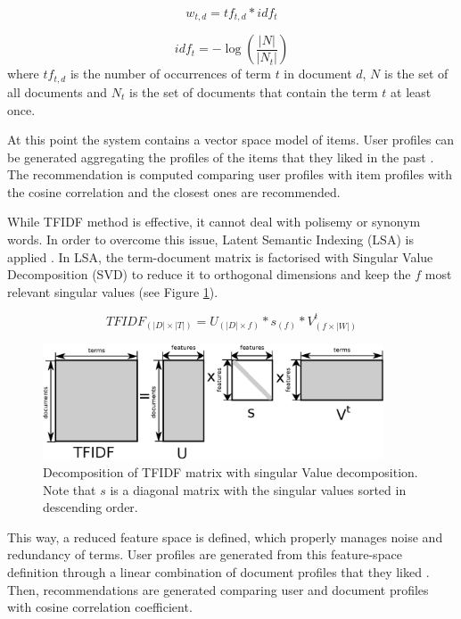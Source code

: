 \documentclass[preprint]{elsarticle}
\begin{document}
\begin{spacing}{1.5}
\begin{equation}
	w_{t,d} = tf_{t,d}*idf_{t}
	\label{eq:document-profile-tfidf-term-weights}
\end{equation}

\begin{equation}
	idf_t = -\log \left( \frac{|N|}{|N_t|}\right)
	\label{eq:document-profile-tfidf-idf}
\end{equation}
\noindent where $tf_{t,d}$ is the number of occurrences of term $t$ in document $d$, $N$ is the set of all documents and $N_t$ is the set of documents that contain the term $t$ at least once.

At this point the system contains a vector space model of items. User profiles can be generated aggregating the profiles of the items that they liked in the past \cite{Symeonidis2007}. The recommendation is computed comparing user profiles with item profiles with the cosine correlation and the closest ones are recommended. 

While TFIDF method is effective, it cannot deal with polisemy or synonym words. In order to overcome this issue, Latent Semantic Indexing (LSA) is applied \cite{deGemmis2015}. In LSA, the term-document matrix is factorised with Singular Value Decomposition (SVD) to reduce it to orthogonal dimensions and keep the $f$ most relevant singular values (see Figure \ref{fig:svd-scheme}).

\begin{equation}
	TFIDF_{(|D|\times|T|)} = U_{(|D|\times f)} * s_{(f)} * V^t_{(f \times |W|)}
	\label{eq:svd}
\end{equation}

\begin{figure}[h]
	\centering
	\includegraphics[width=0.9\textwidth]{figures/svd-scheme.eps}
	\caption{Decomposition of TFIDF matrix with singular Value decomposition. Note that $s$ is a diagonal matrix with the singular values sorted in descending order.}
	\label{fig:svd-scheme}
\end{figure}

This way, a reduced feature space is defined, which properly manages noise and redundancy of terms. User profiles are generated from this feature-space definition through a linear combination of document profiles that they liked \cite{Bambini2011}. Then, recommendations are generated comparing user and document profiles with cosine correlation coefficient.


\end{spacing}
\end{document}

